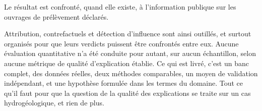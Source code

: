 Le résultat est confronté, quand elle existe, à l'information publique sur les ouvrages de
prélèvement déclarés.

Attribution, contrefactuels et détection d'influence sont ainsi outillés, et surtout organisés
pour que leurs verdicts puissent être confrontés entre eux. Aucune évaluation quantitative n'a
été conduite pour autant, sur aucun échantillon, selon aucune métrique de qualité d'explication
établie. Ce qui est livré, c'est un banc complet, des données réelles, deux méthodes
comparables, un moyen de validation indépendant, et une hypothèse formulée dans les termes du
domaine. Tout ce qu'il faut pour que la question de la qualité des explications se traite sur un
cas hydrogéologique, et rien de plus.
